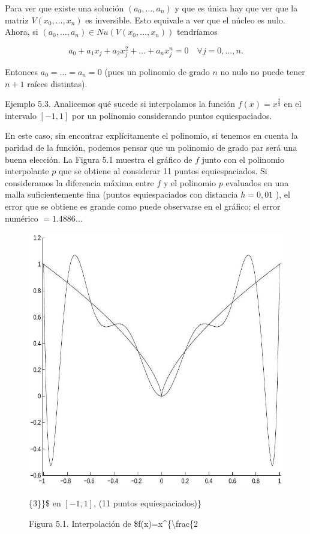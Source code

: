 \documentclass[10pt]{book}
\begin{document}
Para ver que existe una solución $\left(a_{0}, \ldots, a_{n}\right)$ y que es única hay que ver que la matriz $V\left(x_{0}, \ldots, x_{n}\right)$ es inversible. Esto equivale a ver que el núcleo es nulo. Ahora, si $\left(a_{0}, \ldots, a_{n}\right) \in N u\left(V\left(x_{0}, \ldots, x_{n}\right)\right)$ tendríamos

$$
a_{0}+a_{1} x_{j}+a_{2} x_{j}^{2}+\ldots+a_{n} x_{j}^{n}=0 \quad \forall j=0, \ldots, n .
$$

Entonces $a_{0}=\ldots=a_{n}=0$ (pues un polinomio de grado $n$ no nulo no puede tener $n+1$ raíces distintas).

Ejemplo 5.3. Analicemos qué sucede si interpolamos la función $f(x)=x^{\frac{2}{3}}$ en el intervalo $[-1,1]$ por un polinomio considerando puntos equiespaciados.

En este caso, sin encontrar explícitamente el polinomio, si tenemos en cuenta la paridad de la función, podemos pensar que un polinomio de grado par será una buena elección. La Figura 5.1 muestra el gráfico de $f$ junto con el polinomio interpolante $p$ que se obtiene al considerar 11 puntos equiespaciados. Si consideramos la diferencia máxima entre $f$ y el polinomio $p$ evaluados en una malla suficientemente fina (puntos equiespaciados con distancia $h=0,01$ ), el error que se obtiene es grande como puede observarse en el gráfico; el error numérico $=1.4886 \ldots$

\begin{figure}[h]
\begin{center}
  \includegraphics[width=\textwidth]{2025_09_05_3888c9ac96bd653d96b4g-096}
\captionsetup{labelformat=empty}
\caption{Figura 5.1. Interpolación de \$f(x)=x\^{}\{\textbackslash frac\{2}\{3\}\}\$ en $[-1,1]$, (11 puntos equiespaciados)\}\end{center}
\end{figure}
\end{document}
